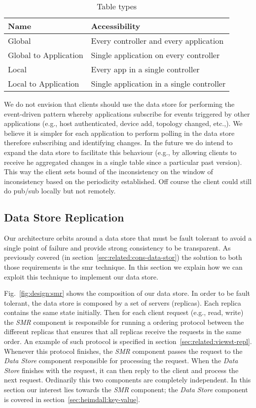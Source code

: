 \begin{table}[ht]
  \centering
  \begin{tabular}{ll}
    Name & Accessibility \\ \toprule 
    Global & Every controller and every application   \\ 
    Global to Application & Single application on every controller \\
    Local & Every app in a single controller \\
    Local to Application &  Single application in a single controller \\ \bottomrule 
  \end{tabular}
  \caption{Table types}
  \label{tab:table-types}
\end{table}

We do not envision that clients should use the data store for performing the event-driven pattern whereby applications subscribe for events triggered by other applications (e.g., host authenticated, device add, topology changed, etc.,). We believe it is simpler for each application to perform polling in the data store therefore subscribing and identifying changes. In the future we do intend to expand the data store to facilitate this behaviour (e.g., by allowing clients to receive he aggregated changes in a single table since a particular past version).
This way the client sets bound of the inconsistency on the window of inconsistency based on the periodicity established. Off course the client could still do pub/sub locally but not remotely. 

\subsection{Data Store Replication}
Our architecture orbits around a data store that must be fault tolerant to avoid a single point of failure and provide strong consistency to be transparent. 
As previously covered (in section~\ref{sec:related:cons-data-stor}) the solution to both those requirements is the \gls{smr}  technique. 
In this section we explain how we can exploit this technique to implement our data store. 

Fig.~\ref{fig:design:smr} shows the composition of our data store. 
In order to be fault tolerant, the data store is composed by a set of servers (replicas). Each replica contains the same state initially. 
Then for each client request (e.g., read, write)  the \emph{SMR} component is responsible for running a ordering protocol between the different replicas that ensures that all replicas receive the requests in the same order.
 An example of such protocol is specified in  section~\ref{sec:related:viewst-repl}. Whenever this protocol finishes, the \emph{SMR} component passes the request to the \emph{Data Store} component responsible for processing the request. 
When the \emph{Data Store} finishes with the request, it can then reply to the client and process the next request.
Ordinarily this two components are completely independent.  In this section our interest lies towards the \emph{SMR} component; the \emph{Data Store} component is covered in section~\ref{sec:heimdall:key-value}. 

